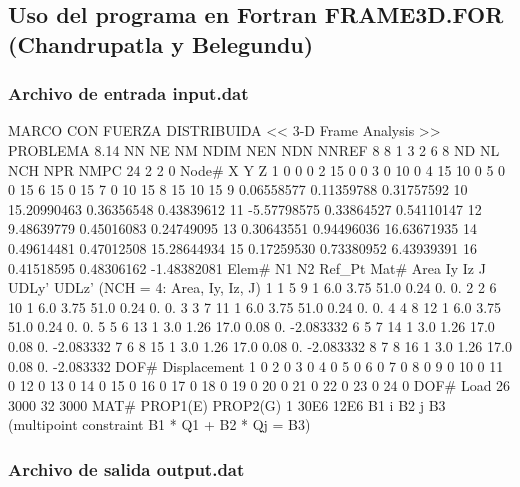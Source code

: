 \documentclass{article}
\begin{document}
    \subsection{Uso del programa en Fortran FRAME3D.FOR (Chandrupatla y
Belegundu)}\label{uso-del-programa-en-fortran-frame3d.for-chandrupatla-y-belegundu}

    \subsubsection{Archivo de entrada
input.dat}\label{archivo-de-entrada-input.dat}

    MARCO CON FUERZA DISTRIBUIDA \textless{}\textless{} 3-D Frame Analysis
\textgreater{}\textgreater{} PROBLEMA 8.14 NN NE NM NDIM NEN NDN NNREF 8
8 1 3 2 6 8 ND NL NCH NPR NMPC 24 2 2 0 Node\# X Y Z 1 0 0 0 2 15 0 0 3
0 10 0 4 15 10 0 5 0 0 15 6 15 0 15 7 0 10 15 8 15 10 15 9 0.06558577
0.11359788 0.31757592 10 15.20990463 0.36356548 0.43839612 11
-5.57798575 0.33864527 0.54110147 12 9.48639779 0.45016083 0.24749095 13
0.30643551 0.94496036 16.63671935 14 0.49614481 0.47012508 15.28644934
15 0.17259530 0.73380952 6.43939391 16 0.41518595 0.48306162 -1.48382081
Elem\# N1 N2 Ref\_Pt Mat\# Area Iy Iz J UDLy' UDLz' (NCH = 4: Area, Iy,
Iz, J) 1 1 5 9 1 6.0 3.75 51.0 0.24 0. 0. 2 2 6 10 1 6.0 3.75 51.0 0.24
0. 0. 3 3 7 11 1 6.0 3.75 51.0 0.24 0. 0. 4 4 8 12 1 6.0 3.75 51.0 0.24
0. 0. 5 5 6 13 1 3.0 1.26 17.0 0.08 0. -2.083332 6 5 7 14 1 3.0 1.26
17.0 0.08 0. -2.083332 7 6 8 15 1 3.0 1.26 17.0 0.08 0. -2.083332 8 7 8
16 1 3.0 1.26 17.0 0.08 0. -2.083332 DOF\# Displacement 1 0 2 0 3 0 4 0
5 0 6 0 7 0 8 0 9 0 10 0 11 0 12 0 13 0 14 0 15 0 16 0 17 0 18 0 19 0 20
0 21 0 22 0 23 0 24 0 DOF\# Load 26 3000 32 3000 MAT\# PROP1(E) PROP2(G)
1 30E6 12E6 B1 i B2 j B3 (multipoint constraint B1 * Q1 + B2 * Qj = B3)

    \subsubsection{Archivo de salida
output.dat}\label{archivo-de-salida-output.dat}
\end{document}
